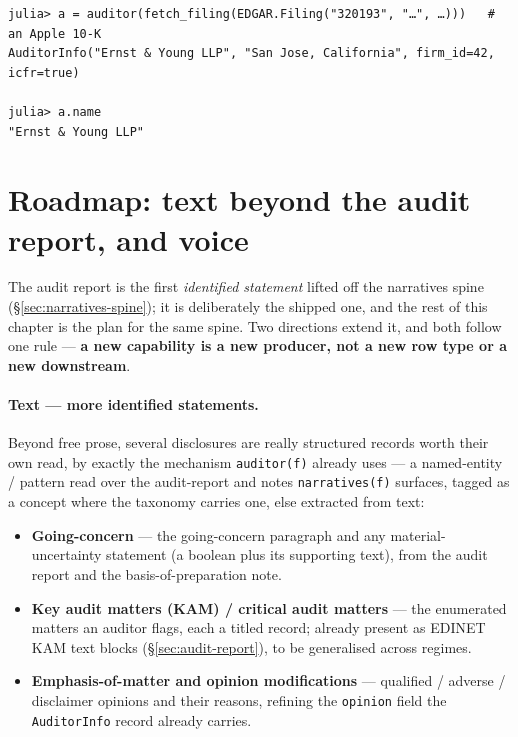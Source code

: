 \documentclass[11pt,a4paper]{report}
\begin{document}
\begin{lstlisting}[style=term]
julia> a = auditor(fetch_filing(EDGAR.Filing("320193", "…", …)))   # an Apple 10-K
AuditorInfo("Ernst & Young LLP", "San Jose, California", firm_id=42, icfr=true)

julia> a.name
"Ernst & Young LLP"
\end{lstlisting}

\section{Roadmap: text beyond the audit report, and voice}
\label{sec:narratives-roadmap}

The audit report is the first \emph{identified statement} lifted off the narratives spine
(\S\ref{sec:narratives-spine}); it is deliberately the shipped one, and the rest of this chapter is the plan
for the same spine. Two directions extend it, and both follow one rule --- \textbf{a new capability is a new
producer, not a new row type or a new downstream}.

\paragraph{Text --- more identified statements.} Beyond free prose, several disclosures are really structured
records worth their own read, by exactly the mechanism \texttt{auditor(f)} already uses --- a named-entity /
pattern read over the audit-report and notes \texttt{narratives(f)} surfaces, tagged as a concept where the
taxonomy carries one, else extracted from text:
\begin{itemize}
  \item \textbf{Going-concern} --- the going-concern paragraph and any material-uncertainty statement (a
    boolean plus its supporting text), from the audit report and the basis-of-preparation note.
  \item \textbf{Key audit matters (KAM) / critical audit matters} --- the enumerated matters an auditor
    flags, each a titled record; already present as EDINET KAM text blocks (\S\ref{sec:audit-report}), to be
    generalised across regimes.
  \item \textbf{Emphasis-of-matter and opinion modifications} --- qualified / adverse / disclaimer opinions
    and their reasons, refining the \texttt{opinion} field the \texttt{AuditorInfo} record already carries.
\end{itemize}
\end{document}
